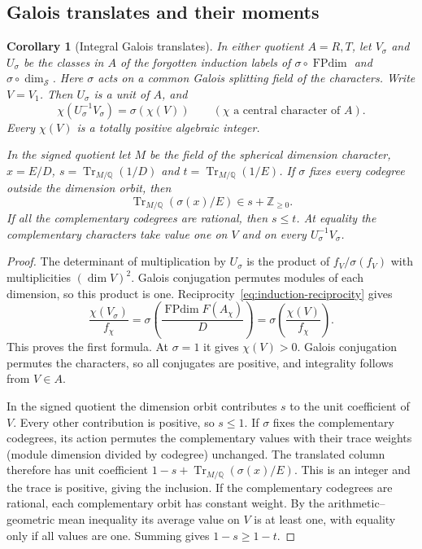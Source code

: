 \documentclass[11pt,reqno]{amsart}
\newtheorem{corollary}[theorem]{Corollary}
\theoremstyle{remark}\newtheorem{remark}[theorem]{Remark}
\numberwithin{equation}{section}
\begin{document}
\subsection{Galois translates and their moments}
\begin{corollary}[Integral Galois translates]\label{cor:galois-columns}
In either quotient $A=R,T$, let $V_\sigma$
and $U_\sigma$ be the classes in $A$ of the forgotten induction
labels of $\sigma\circ\operatorname{FPdim}$ and
$\sigma\circ\dim_{\mathcal S}$. Here $\sigma$ acts on a common
Galois splitting field of the characters. Write $V=V_1$. Then
$U_\sigma$ is a unit of $A$, and
\[
 \chi(U_\sigma^{-1}V_\sigma)=\sigma(\chi(V))
 \qquad(\chi\text{ a central character of }A).
\]
Every $\chi(V)$ is a totally positive algebraic integer.

In the signed quotient let $M$ be the field of the spherical dimension
character, $x=E/D$, $s=\operatorname{Tr}_{M/\mathbb Q}(1/D)$ and
$t=\operatorname{Tr}_{M/\mathbb Q}(1/E)$. If $\sigma$ fixes every
codegree outside the dimension orbit, then
\[
    \operatorname{Tr}_{M/\mathbb Q}(\sigma(x)/E)\in s+\mathbb Z_{\ge0}.
\]
If all the complementary codegrees are rational, then $s\le t$.
At equality the complementary characters take value one on $V$
and on every $U_\sigma^{-1}V_\sigma$.
\end{corollary}
\begin{proof}
The determinant of multiplication by $U_\sigma$ is the product of
$f_V/\sigma(f_V)$ with multiplicities $(\dim V)^2$. Galois conjugation
permutes modules of each dimension, so this product is one.
Reciprocity~\eqref{eq:induction-reciprocity} gives
\[
  \frac{\chi(V_\sigma)}{f_\chi}
   =\sigma\!\left(\frac{\operatorname{FPdim}F(A_\chi)}{D}\right)
   =\sigma\!\left(\frac{\chi(V)}{f_\chi}\right).
\]
This proves the first formula. At $\sigma=1$ it gives $\chi(V)>0$.
Galois conjugation permutes the characters, so all conjugates are
positive, and integrality follows from $V\in A$.

In the signed quotient the dimension orbit contributes $s$ to the
unit coefficient of $V$. Every other contribution is positive, so
$s\le1$. If $\sigma$ fixes the complementary codegrees, its action
permutes the complementary values with their trace weights (module dimension divided by codegree) unchanged. The translated column therefore has
unit coefficient $1-s+\operatorname{Tr}_{M/\mathbb Q}(\sigma(x)/E)$.
This is an integer and the trace is positive, giving the inclusion.
If the complementary codegrees are rational, each complementary
orbit has constant weight. By the arithmetic--geometric mean
inequality its average value on $V$ is at least one, with equality
only if all values are one. Summing gives $1-s\ge1-t$.
\end{proof}
\end{document}
